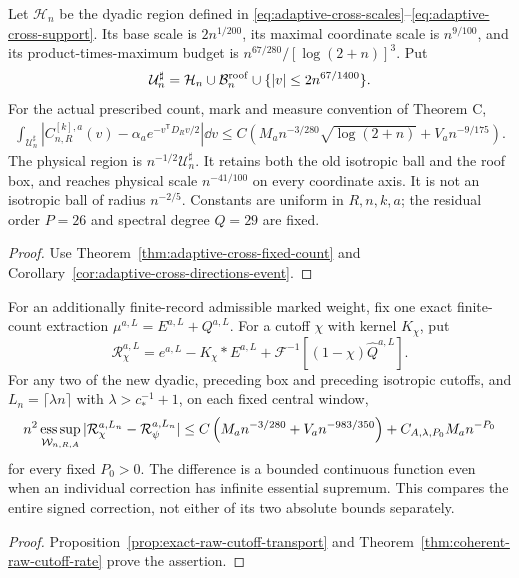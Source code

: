 \begin{maintheorem}
\label{thm:intro-adaptive-cross}
Let $\mathcal H_n$ be the dyadic region defined in
\eqref{eq:adaptive-cross-scales}--\eqref{eq:adaptive-cross-support}.
Its base scale is $2n^{1/200}$, its maximal coordinate scale is
$n^{9/100}$, and its product-times-maximum budget is
$n^{67/280}/[\log(2+n)]^3$. Put
\[
 \mathcal U_n^\sharp=\mathcal H_n\cup\mathcal B_n^{\rm roof}
                         \cup\{|v|\le2n^{67/1400}\}.
\]
For the actual prescribed count, mark and measure convention of
Theorem C,
\begin{align*}
 \int_{\mathcal U_n^\sharp}
 |C^{[k],a}_{n,R}(v)-\alpha_a e^{-v^{\mathsf T}D_Rv/2}|\dd v
 \le C\left(M_an^{-3/280}\sqrt{\log(2+n)}+V_an^{-9/175}\right).
\end{align*}
The physical region is $n^{-1/2}\mathcal U_n^\sharp$. It retains
both the old isotropic ball and the roof box, and reaches physical
scale $n^{-41/100}$ on every coordinate axis. It is not an isotropic
ball of radius $n^{-2/5}$. Constants are uniform in $R,n,k,a$;
the residual order $P=26$ and spectral degree $Q=29$ are fixed.
\end{maintheorem}
\begin{proof}
Use Theorem~\ref{thm:adaptive-cross-fixed-count} and
Corollary~\ref{cor:adaptive-cross-directions-event}.
\end{proof}

\begin{maintheorem}
\label{thm:intro-coherent-raw-transport}
For an additionally finite-record admissible marked weight, fix one
exact finite-count extraction $\mu^{a,L}=E^{a,L}+Q^{a,L}$.
For a cutoff $\chi$ with kernel $K_\chi$, put
\[
 \mathcal R_\chi^{a,L}=e^{a,L}-K_\chi*E^{a,L}
            +\mathcal F^{-1}[(1-\chi)\widehat Q^{a,L}].
\]
For any two of the new dyadic, preceding box and preceding isotropic
cutoffs, and $L_n=\lceil\lambda n\rceil$ with
$\lambda>c_*^{-1}+1$, on each fixed central window,
\begin{align*}
 n^2\mathop{\rm ess\,sup}_{\mathcal W_{n,R,A}}
 |\mathcal R_\chi^{a,L_n}-\mathcal R_\psi^{a,L_n}|
 \le C\left(M_an^{-3/280}+V_an^{-983/350}\right)
        +C_{A,\lambda,P_0}M_an^{-P_0}
\end{align*}
for every fixed $P_0>0$. The difference is a bounded continuous
function even when an individual correction has infinite essential
supremum. This compares the entire signed correction, not either of
its two absolute bounds separately.
\end{maintheorem}
\begin{proof}
Proposition~\ref{prop:exact-raw-cutoff-transport} and
Theorem~\ref{thm:coherent-raw-cutoff-rate} prove the assertion.
\end{proof}

